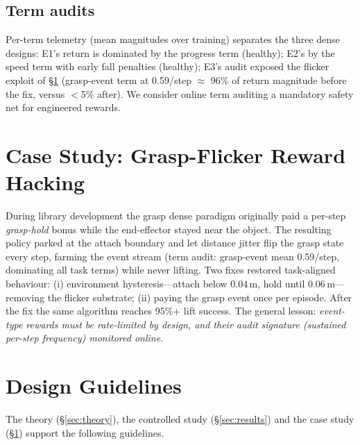 \documentclass[journal,twoside]{IEEEtran}
\begin{document}
\subsection{Term audits}
Per-term telemetry (mean magnitudes over training) separates the three
dense designs: E1's return is dominated by the progress term (healthy);
E2's by the speed term with early fall penalties (healthy); E3's audit
exposed the flicker exploit of \S\ref{sec:hacking} (grasp-event term at
0.59/step $\approx$ 96\% of return magnitude before the fix, versus
$<$5\% after). We consider online term auditing a mandatory safety net
for engineered rewards.

\section{Case Study: Grasp-Flicker Reward Hacking}
\label{sec:hacking}
During library development the grasp dense paradigm originally paid a
per-step \emph{grasp-hold} bonus while the end-effector stayed near the
object. The resulting policy parked at the attach boundary and let
distance jitter flip the grasp state every step, farming the event stream
(term audit: grasp-event mean 0.59/step, dominating all task terms) while
never lifting. Two fixes restored task-aligned behaviour: (i) environment
hysteresis---attach below $0.04$\,m, hold until $0.06$\,m---removing the
flicker substrate; (ii) paying the grasp event once per episode. After the
fix the same algorithm reaches 95\%+ lift success. The general lesson:
\emph{event-type rewards must be rate-limited by design, and their audit
signature (sustained per-step frequency) monitored online}.

\section{Design Guidelines}
\label{sec:guidelines}
The theory (\S\ref{sec:theory}), the controlled study (\S\ref{sec:results})
and the case study (\S\ref{sec:hacking}) support the following guidelines.
\end{document}
